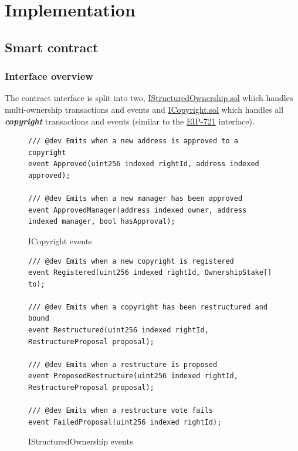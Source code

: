 \documentclass[12pt]{article}
\newcommand{\keyword}[1]{\textbf{\textit{#1}}}
\begin{document}
\section{Implementation}

\subsection{Smart contract}

\subsubsection{Interface overview}


The contract interface is split into two, \href{https://github.com/MrHarrisonBarker/CRPL/blob/main/CRPL.Contracts/contracts/IStructuredOwnership.sol}{IStructuredOwnership.sol} which handles multi-ownership transactions and events and \href{https://github.com/MrHarrisonBarker/CRPL/blob/main/CRPL.Contracts/contracts/ICopyright.sol}{ICopyright.sol} which handles all \keyword{copyright} transactions and events (similar to the \href{https://eips.ethereum.org/EIPS/eip-721}{EIP-721} interface).

\begin{figure}[H]
\caption{ICopyright events}
\begin{lstlisting}[language=Solidity]
/// @dev Emits when a new address is approved to a copyright
event Approved(uint256 indexed rightId, address indexed approved);

/// @dev Emits when a new manager has been approved
event ApprovedManager(address indexed owner, address indexed manager, bool hasApproval);
\end{lstlisting}
\end{figure}

\begin{figure}[H]
\caption{IStructuredOwnership events}
\centering
\begin{lstlisting}[language=Solidity]
/// @dev Emits when a new copyright is registered
event Registered(uint256 indexed rightId, OwnershipStake[] to);

/// @dev Emits when a copyright has been restructured and bound
event Restructured(uint256 indexed rightId, RestructureProposal proposal);

/// @dev Emits when a restructure is proposed
event ProposedRestructure(uint256 indexed rightId, RestructureProposal proposal);

/// @dev Emits when a restructure vote fails
event FailedProposal(uint256 indexed rightId);
\end{lstlisting}
\end{figure}
\end{document}
